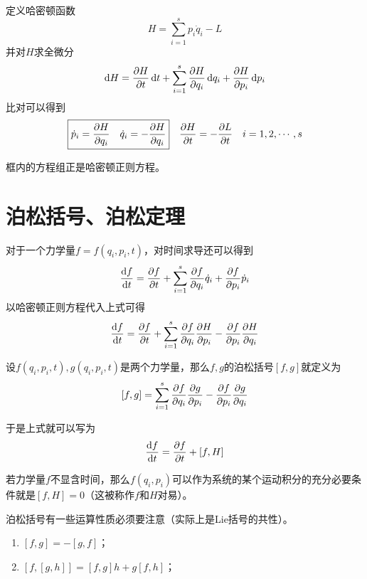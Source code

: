         定义哈密顿函数
        \begin{equation}
            H=\sum_{i=1}^{s}p_i\dot{q}_i - L
        \end{equation}
        并对$H$求全微分
        \begin{equation}
            \label{哈密顿函数}
            \dd{H}=\pdv{H}{t}\dd{t}+\sum_{i=1}^{s}\pdv{H}{q_i}\dd{q_i}+\pdv{H}{p_i}\dd{p_i}
        \end{equation}
        比对可以得到
        \begin{equation}
            \label{正则方程}
            \boxed{\dot{p}_i=\pdv{H}{q_i} \quad \dot{q}_i=-\pdv{H}{q_i}} \quad \pdv{H}{t}=-\pdv{L}{t} \quad i=1,2,\cdots,s
        \end{equation}

        框内的方程组正是哈密顿正则方程。

        \section{泊松括号、泊松定理}
        对于一个力学量$f=f(q_i,p_i,t)$，对时间求导还可以得到
        \begin{equation}
            \dv{f}{t}=\pdv{f}{t}+\sum_{i=1}^{s}\pdv{f}{q_i}\dot{q}_i+\pdv{f}{p_i}\dot{p}_i
        \end{equation}
        以哈密顿正则方程代入上式可得
        \begin{equation}
            \dv{f}{t}=\pdv{f}{t}+\sum_{i=1}^{s}\pdv{f}{q_i}\pdv{H}{p_i}-\pdv{f}{p_i}\pdv{H}{q_i}
        \end{equation}

        \begin{definition}[泊松括号]
            设$f(q_i,p_i,t),g(q_i,p_i,t)$是两个力学量，那么$f,g$的泊松括号$[f,g]$就定义为
            \[
            [f,g]=\sum_{i=1}^{s}\pdv{f}{q_i}\pdv{g}{p_i}-\pdv{f}{p_i}\pdv{g}{q_i}
            \]
        \end{definition}

        于是上式就可以写为
        \begin{equation}
            \dv{f}{t}=\pdv{f}{t}+[f,H]
        \end{equation}
        
        若力学量$f$不显含时间，那么$f(q_i,p_i)$可以作为系统的某个运动积分的充分必要条件就是$[f,H]=0$（这被称作$f$和$H$对易）。

        泊松括号有一些运算性质必须要注意（实际上是Lie括号的共性）。
        \begin{enumerate}
            \item $[f,g]=-[g,f]$；
            \item $[f,[g,h]]=[f,g]h+g[f,h]$；
        \end{enumerate}